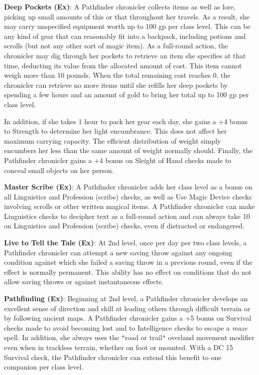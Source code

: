 \textbf{Deep Pockets (Ex)}: A Pathfinder chronicler collects items as well as lore, picking up small amounts of this or that throughout her travels. As a result, she may carry unspecified equipment worth up to 100 gp per class level. This can be any kind of gear that can reasonably fit into a backpack, including potions and scrolls (but not any other sort of magic item). As a full-round action, the chronicler may dig through her pockets to retrieve an item she specifies at that time, deducting its value from the allocated amount of cost. This item cannot weigh more than 10 pounds. When the total remaining cost reaches 0, the chronicler can retrieve no more items until she refills her deep pockets by spending a few hours and an amount of gold to bring her total up to 100 gp per class level.
				
In addition, if she takes 1 hour to pack her gear each day, she gains a +4 bonus to Strength to determine her light encumbrance. This does not affect her maximum carrying capacity. The efficient distribution of weight simply encumbers her less than the same amount of weight normally should. Finally, the Pathfinder chronicler gains a +4 bonus on Sleight of Hand checks made to conceal small objects on her person.
				
\textbf{Master Scribe (Ex)}: A Pathfinder chronicler adds her class level as a bonus on all Linguistics and Profession (scribe) checks, as well as Use Magic Device checks involving scrolls or other written magical items. A Pathfinder chronicler can make Linguistics checks to decipher text as a full-round action and can always take 10 on Linguistics and Profession (scribe) checks, even if distracted or endangered. 
				
\textbf{Live to Tell the Tale (Ex)}: At 2nd level, once per day per two class levels, a Pathfinder chronicler can attempt a new saving throw against any ongoing condition against which she failed a saving throw in a previous round, even if the effect is normally permanent. This ability has no effect on conditions that do not allow saving throws or against instantaneous effects. 
				
\textbf{Pathfinding (Ex)}: Beginning at 2nd level, a Pathfinder chronicler develops an excellent sense of direction and skill at leading others through difficult terrain or by following ancient maps. A Pathfinder chronicler gains a +5 bonus on Survival checks made to avoid becoming lost and to Intelligence checks to escape a \textit{maze} spell. In addition, she always uses the \texttt{{}"{}}road or trail\texttt{{}"{}} overland movement modifier even when in trackless terrain, whether on foot or mounted. With a DC 15 Survival check, the Pathfinder chronicler can extend this benefit to one companion per class level. 
				
